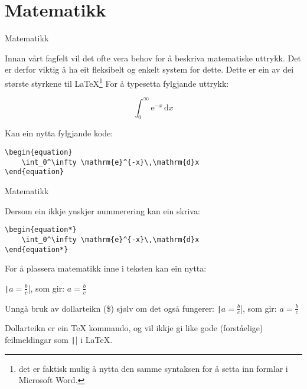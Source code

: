 \section{Matematikk}

	\begin{frame}[containsverbatim]{Matematikk}
	
	Innan vårt fagfelt vil det ofte vera behov for å beskriva matematiske uttrykk. Det er derfor viktig å ha eit fleksibelt og enkelt system for dette. Dette er ein av dei største styrkene til \LaTeX\footnote{det er faktisk mulig å nytta den samme syntaksen for å setta inn formlar i Microsoft Word.} For å typesetta fylgjande uttrykk:
	
	\begin{equation}
		\int_0^\infty \mathrm{e}^{-x}\,\mathrm{d}x
	\end{equation}
	
	Kan ein nytta fylgjande kode:
	
	\begin{verbatim}
\begin{equation}
	\int_0^\infty \mathrm{e}^{-x}\,\mathrm{d}x
\end{equation}
	\end{verbatim}
	
\end{frame}




\begin{frame}[containsverbatim]{Matematikk}
	
	Dersom ein ikkje ynskjer nummerering kan ein skriva:
	
	\begin{verbatim}
\begin{equation*}
	\int_0^\infty \mathrm{e}^{-x}\,\mathrm{d}x
\end{equation*}
	\end{verbatim}
	
	For å plassera matematikk inne i teksten kan ein nytta:
	
	\texttt|\(a = \frac{b}{c}\)|, som gir: \(a = \frac{b}{c}\)
	
	Unngå bruk av dollarteikn (\$) sjølv om det også fungerer:
	\texttt|$a = \frac{b}{c}$|, som gir: $a = \frac{b}{c}$
	
	Dollarteikn er ein \TeX{} kommando, og vil ikkje gi like gode (forståelige) feilmeldingar som \texttt|\(\)| i \LaTeX{}.
	
	
	
\end{frame}



